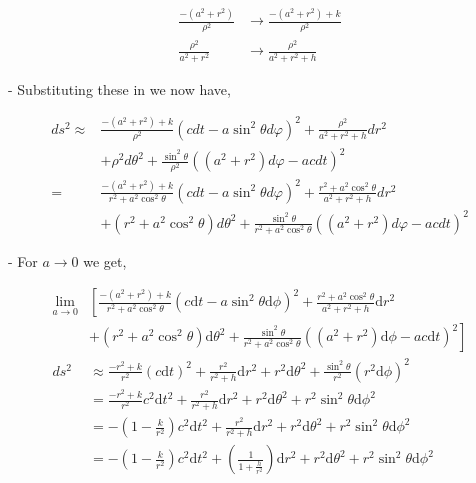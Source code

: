\begin{align}
    \frac{-\left(a^2+r^2\right)}{\rho^2} & \rightarrow \frac{-\left(a^2+r^2\right)+k}{\rho^2} \\
    \frac{\rho^2}{a^2+r^2}               & \rightarrow \frac{\rho^2}{a^2+r^2+h}
\end{align}


- Substituting these in we now have,


\begin{align}
    d s^2 \approx & \frac{-\left(a^2+r^2\right)+k}{\rho^2}\left(c d t-a \sin ^2 \theta d \varphi\right)^2+\frac{\rho^2}{a^2+r^2+h} d r^2                                 \\
                  & +\rho^2 d \theta^2+\frac{\sin ^2 \theta}{\rho^2}\left(\left(a^2+r^2\right) d \varphi-a c d t\right)^2                                                \\
    =             & \frac{-\left(a^2+r^2\right)+k}{r^2+a^2 \cos ^2 \theta}\left(c d t-a \sin ^2 \theta d \varphi\right)^2+\frac{r^2+a^2 \cos ^2 \theta}{a^2+r^2+h} d r^2 \\
                  & +\left(r^2+a^2 \cos ^2 \theta\right) d \theta^2+\frac{\sin ^2 \theta}{r^2+a^2 \cos ^2 \theta}\left(\left(a^2+r^2\right) d \varphi-a c d t\right)^2
\end{align}

- For $a \rightarrow 0$ we get,

\begin{align*}
    \lim _{a \rightarrow 0} & \left[ \frac{-(a^2+r^2)+k}{r^2+a^2 \cos^2 \theta}(c\mathrm{d}t-a\sin^2\theta\mathrm{d}\phi)^2 + \frac{r^2+a^2\cos^2\theta}{a^2+r^2+h}\mathrm{d}r^2 \right.      \\
                            & +\left. (r^2+a^2\cos^2\theta)\mathrm{d}\theta^2 + \frac{\sin^2\theta}{r^2+a^2\cos^2\theta}\left((a^2+r^2)\mathrm{d}\phi - ac\mathrm{d}t\right)^2 \right]        \\
    ds^2                    & \approx \frac{-r^2+k}{r^2}(c\mathrm{d}t)^2 + \frac{r^2}{r^2+h}\mathrm{d}r^2 + r^2\mathrm{d}\theta^2 + \frac{\sin^2\theta}{r^2}(r^2\mathrm{d}\phi)^2             \\
                            & = \frac{-r^2+k}{r^2}c^2\mathrm{d}t^2 + \frac{r^2}{r^2+h}\mathrm{d}r^2 + r^2\mathrm{d}\theta^2 + r^2\sin^2\theta\mathrm{d}\phi^2                                 \\
                            & = -\left(1-\frac{k}{r^2}\right)c^2\mathrm{d}t^2 + \frac{r^2}{r^2+h}\mathrm{d}r^2 + r^2\mathrm{d}\theta^2 + r^2\sin^2\theta\mathrm{d}\phi^2                      \\
                            & = -\left(1-\frac{k}{r^2}\right)c^2\mathrm{d}t^2 + \left(\frac{1}{1+\frac{h}{r^2}}\right)\mathrm{d}r^2 + r^2\mathrm{d}\theta^2 + r^2\sin^2\theta\mathrm{d}\phi^2
\end{align*}

